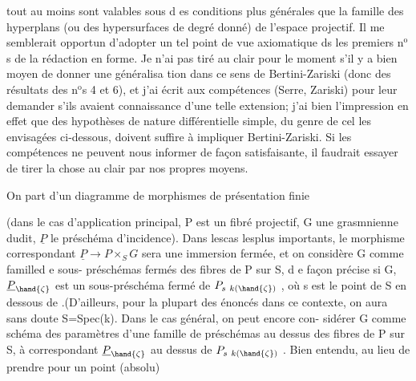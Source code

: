 
tout au moins sont valables sous d es conditions plus générales que  la
famille des hyperplans (ou des hypersurfaces de degré donné) de l'espace
projectif. Il me semblerait opportun d'adopter un tel point de vue
axiomatique ds les premiers n$^{\text{o}}$s de la rédaction en forme. Je n'ai pas
tiré au clair pour le moment s'il y a bien moyen de donner une généralisa%
tion dans ce sens de Bertini-Zariski (donc des résultats des n$^{\text{o}}$s 4 et 6),
et j'ai écrit aux compétences (Serre, Zariski) pour leur demander s'ils
avaient connaissance d'une telle extension; j'ai bien l'impression en
effet que des hypothèses de nature différentielle simple, du genre de cel
les envisagées ci-dessous, doivent suffire à impliquer Bertini-Zariski.
Si les compétences ne peuvent nous informer de façon satisfaisante, il
faudrait essayer de tirer la chose au clair par nos propres moyens.

On part d'un diagramme  de morphismes de présentation finie


(dans le cas d'application principal, P est un fibré projectif, G une
grasmnienne dudit, $\underline{P}$ le préschéma d'incidence). Dans lescas lesplus
importants, le morphisme correspondant $\underline{P} \longrightarrow P\times_S G$ sera une immersion
fermée, et on considère G comme   familled e sous-
préschémas fermés des fibres de P sur S, d e façon précise si \hand{$\zeta$} \hand{$\in$} G,
$\underline{P}_{\hand{\zeta}}$ est un sous-préschéma fermé de $P_{s\ k(\hand{\zeta})}$ , où s est le point de S en
dessous de \hand{$\zeta$} .(D'ailleurs, pour la plupart des énoncés dans ce contexte,
on aura sans doute S=Spec(k)\hand{)}. Dans le cas général, on peut encore con-%
sidérer G comme schéma des paramètres d'une famille de préschémas
au dessus des fibres de P sur S, à \hand{$\zeta$} correspondant $\underline{P}_{\hand{\zeta}}$ au dessus de
$P_{s\ k(\hand{\zeta})}$ . Bien entendu, au lieu de prendre pour \hand{$\zeta$} un point  (absolu)

